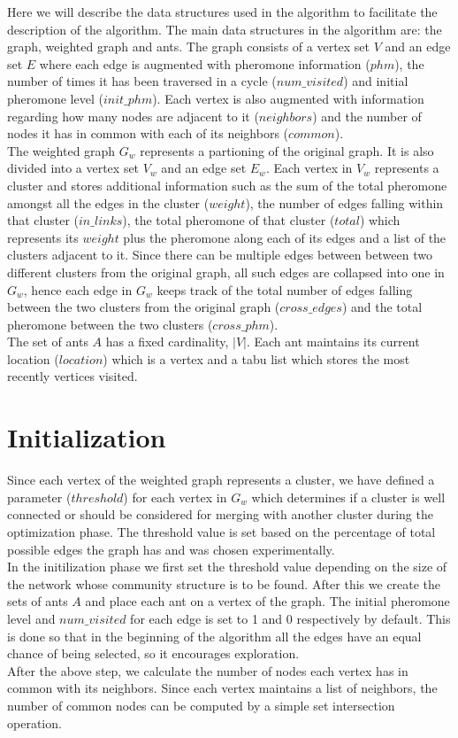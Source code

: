 \begin{spacing}{1.5}
Here we will describe the data structures used in the algorithm to facilitate the description of the algorithm. The main data structures in the algorithm are: the graph, weighted graph and ants. The graph consists of a vertex set $V$ and an edge set $E$ where each edge is augmented with pheromone information ($phm$), the number of times it has been traversed in a cycle ($num\_visited$) and initial pheromone level ($init\_phm$). Each vertex is also augmented with information regarding how many nodes are adjacent to it ($neighbors$) and the number of nodes it has in common with each of its neighbors ($common$).\\
\indent The weighted graph $G_w$ represents a partioning of the original graph. It is also divided into a vertex set $V_w$ and an edge set $E_w$. Each vertex in $V_w$ represents a cluster and stores additional information such as the sum of the total pheromone amongst all the edges in the cluster ($weight$), the number of edges falling within that cluster ($in\_links$), the total pheromone of that cluster ($total$) which represents its $weight$ plus the pheromone along each of its edges and a list of the clusters adjacent to it. Since there can be multiple edges between between two different clusters from the original graph, all such edges are collapsed into one in $G_w$, hence each edge in $G_w$ keeps track of the total number of edges falling between the two clusters from the original graph ($cross\_edges$) and the total pheromone between the two clusters ($cross\_phm$).\\
\indent The set of ants $A$ has a fixed cardinality, $|V|$. Each ant maintains its current location ($location$) which is a vertex and a tabu list which stores the most recently vertices visited.

\section{Initialization}

Since each vertex of the weighted graph represents a cluster, we have defined a parameter ($threshold$) for each vertex in $G_w$ which determines if a cluster is well connected or should be considered for merging with another cluster during the optimization phase. The threshold value is set based on the percentage of total possible edges the graph has and was chosen experimentally.\\
\indent In the initilization phase we first set the threshold value depending on the size of the network whose community structure is to be found. After this we create the sets of ants $A$ and place each ant on a vertex of the graph. The initial pheromone level and $num\_visited$ for each edge is set to 1 and 0 respectively by default. This is done so that in the beginning of the algorithm all the edges have an equal chance of being selected, so it encourages exploration.\\
\indent After the above step, we calculate the number of nodes each vertex has in common with its neighbors. Since each vertex maintains a list of neighbors, the number of common nodes can be computed by a simple set intersection operation.


\end{spacing}
